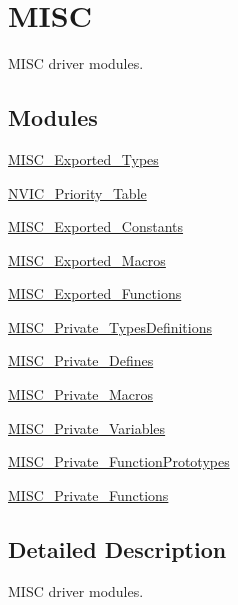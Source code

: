\hypertarget{group___m_i_s_c}{}\section{M\+I\+SC}
\label{group___m_i_s_c}


M\+I\+SC driver modules.  


\subsection*{Modules}
\begin{DoxyCompactItemize}
\item 
\hyperlink{group___m_i_s_c___exported___types}{M\+I\+S\+C\+\_\+\+Exported\+\_\+\+Types}
\item 
\hyperlink{group___n_v_i_c___priority___table}{N\+V\+I\+C\+\_\+\+Priority\+\_\+\+Table}
\item 
\hyperlink{group___m_i_s_c___exported___constants}{M\+I\+S\+C\+\_\+\+Exported\+\_\+\+Constants}
\item 
\hyperlink{group___m_i_s_c___exported___macros}{M\+I\+S\+C\+\_\+\+Exported\+\_\+\+Macros}
\item 
\hyperlink{group___m_i_s_c___exported___functions}{M\+I\+S\+C\+\_\+\+Exported\+\_\+\+Functions}
\item 
\hyperlink{group___m_i_s_c___private___types_definitions}{M\+I\+S\+C\+\_\+\+Private\+\_\+\+Types\+Definitions}
\item 
\hyperlink{group___m_i_s_c___private___defines}{M\+I\+S\+C\+\_\+\+Private\+\_\+\+Defines}
\item 
\hyperlink{group___m_i_s_c___private___macros}{M\+I\+S\+C\+\_\+\+Private\+\_\+\+Macros}
\item 
\hyperlink{group___m_i_s_c___private___variables}{M\+I\+S\+C\+\_\+\+Private\+\_\+\+Variables}
\item 
\hyperlink{group___m_i_s_c___private___function_prototypes}{M\+I\+S\+C\+\_\+\+Private\+\_\+\+Function\+Prototypes}
\item 
\hyperlink{group___m_i_s_c___private___functions}{M\+I\+S\+C\+\_\+\+Private\+\_\+\+Functions}
\end{DoxyCompactItemize}


\subsection{Detailed Description}
M\+I\+SC driver modules. 

